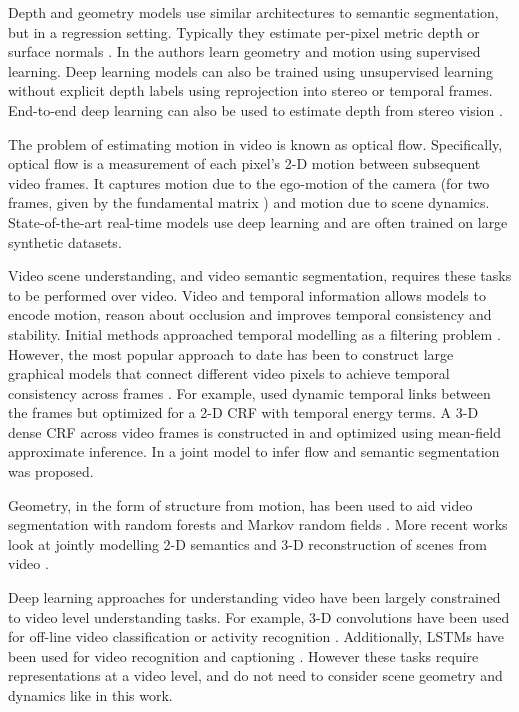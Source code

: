 Depth and geometry models use similar architectures to semantic segmentation, but in a regression setting. Typically they estimate per-pixel metric depth or surface normals \citep{eigen2015predicting}. In \citep{UZUMIDB17} the authors learn geometry and motion using supervised learning. Deep learning models can also be trained using unsupervised learning without explicit depth labels using reprojection into stereo \citep{garg2016unsupervised} or temporal \citep{zhou2017unsupervised} frames. End-to-end deep learning can also be used to estimate depth from stereo vision \citep{kendall2017end}.

The problem of estimating motion in video is known as optical flow. Specifically, optical flow is a measurement of each pixel's 2-D motion between subsequent video frames. It captures motion due to the ego-motion of the camera (for two frames, given by the fundamental matrix \citep{hartley2000}) and motion due to scene dynamics. State-of-the-art real-time models use deep learning \citep{dosovitskiy2015flownet,flownet2} and are often trained on large synthetic datasets.

Video scene understanding, and video semantic segmentation, requires these tasks to be performed over video. Video and temporal information allows models to encode motion, reason about occlusion and improves temporal consistency and stability. Initial methods approached temporal modelling as a filtering problem \citep{miksik2013efficient}.
However, the most popular approach to date has been to construct large graphical models that connect different video pixels to achieve temporal consistency across frames \citep{de2012line,chen2011temporally,tripathi2015semantic,hur2016joint}. For example,\citep{chen2011temporally} used dynamic temporal links between the frames but optimized for a 2-D CRF with temporal energy terms.
A 3-D dense CRF across video frames is constructed in \citep{tripathi2015semantic} and optimized using mean-field approximate inference. In \citep{hur2016joint} a joint model to infer flow and semantic segmentation was proposed.

Geometry, in the form of structure from motion, has been used to aid video segmentation with random forests \citep{brostow2008segmentation} and Markov random fields \citep{tighe2013superparsing}.
More recent works look at jointly modelling 2-D semantics and 3-D reconstruction of scenes from video \citep{kundu2014joint,sengupta2013urban}.

Deep learning approaches for understanding video have been largely constrained to video level understanding tasks. For example, 3-D convolutions have been used for off-line video classification \citep{karpathy2014large} or activity recognition \citep{ji20133d}. Additionally, LSTMs have been used for video recognition and captioning \citep{donahue2015long}. However these tasks require representations at a video level, and do not need to consider scene geometry and dynamics like in this work.

